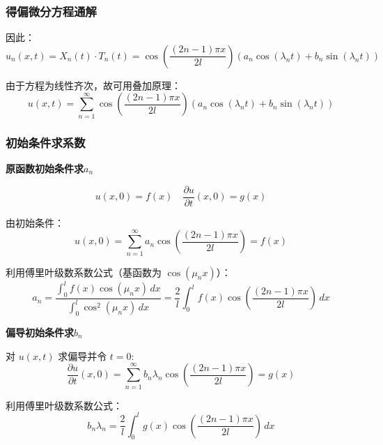 \documentclass[12pt,a4paper]{article}
\numberwithin{subsection}{section}
\numberwithin{subsubsection}{subsection}
\theoremstyle{plain}
\theoremstyle{definition}
\theoremstyle{remark}
\begin{document}
	\subsubsection{得偏微分方程通解}
	因此：
	\begin{equation}
		u_n(x, t) = X_n(t) \cdot T_n(t) = \cos\left(\frac{(2n-1)\pi x}{2l}\right) \left( a_n \cos(\lambda_n t) + b_n \sin(\lambda_n t) \right)
	\end{equation}
	
	由于方程为线性齐次，故可用叠加原理：
	\begin{equation}
		u(x, t) = \sum_{n=1}^{\infty} \cos\left(\frac{(2n-1)\pi x}{2l}\right) \left( a_n \cos(\lambda_n t) + b_n \sin(\lambda_n t) \right)
	\end{equation}
	
	\subsubsection{初始条件求系数}
	\noindent
	\textbf{原函数初始条件求$a_n$}
	
	\begin{equation}
		u(x, 0) = f(x) \quad \frac{\partial u}{\partial t}(x, 0) = g(x)
	\end{equation}
	
	由初始条件：
	\begin{equation}
		u(x, 0) = \sum_{n=1}^{\infty} a_n \cos\left(\frac{(2n-1)\pi x}{2l}\right) = f(x)
	\end{equation}
	
	利用傅里叶级数系数公式（基函数为 $\cos(\mu_n x)$）：
	\begin{equation}
		a_n = \frac{\int_0^l f(x) \cos(\mu_n x) \, dx}{\int_0^l \cos^2(\mu_n x) \, dx} = \frac{2}{l} \int_0^l f(x) \cos\left(\frac{(2n-1)\pi x}{2l}\right) \, dx
	\end{equation}
	
	\noindent
	\textbf{偏导初始条件求$b_n$}
	
	对 $u(x,t)$ 求偏导并令 $t=0$:
	\begin{equation}
		\frac{\partial u}{\partial t}(x, 0) = \sum_{n=1}^{\infty} b_n \lambda_n \cos\left(\frac{(2n-1)\pi x}{2l}\right) = g(x)
	\end{equation}
	
	利用傅里叶级数系数公式：
	\begin{equation}
		b_n \lambda_n = \frac{2}{l} \int_0^l g(x) \cos\left(\frac{(2n-1)\pi x}{2l}\right) \, dx
	\end{equation}
	
\end{document}

